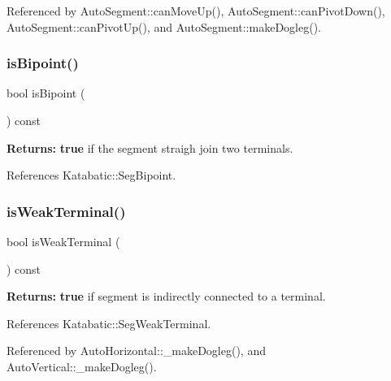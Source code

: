 Referenced by Auto\+Segment\+::can\+Move\+Up(), Auto\+Segment\+::can\+Pivot\+Down(), Auto\+Segment\+::can\+Pivot\+Up(), and Auto\+Segment\+::make\+Dogleg().

\mbox{\label{classKatabatic_1_1AutoSegment_a72741158d19af38e84c5e9c08f91270f}} 
\subsubsection{\texorpdfstring{is\+Bipoint()}{isBipoint()}}
{\footnotesize\ttfamily bool is\+Bipoint (\begin{DoxyParamCaption}{ }\end{DoxyParamCaption}) const\hspace{0.3cm}{\ttfamily [inline]}}

{\bfseries Returns\+:} {\bfseries true} if the segment straigh join two terminals. 

References Katabatic\+::\+Seg\+Bipoint.

\mbox{\label{classKatabatic_1_1AutoSegment_aef3a61d223be84ac336c4f7bc64884ba}} 
\subsubsection{\texorpdfstring{is\+Weak\+Terminal()}{isWeakTerminal()}}
{\footnotesize\ttfamily bool is\+Weak\+Terminal (\begin{DoxyParamCaption}{ }\end{DoxyParamCaption}) const\hspace{0.3cm}{\ttfamily [inline]}}

{\bfseries Returns\+:} {\bfseries true} if segment is indirectly connected to a terminal. 

References Katabatic\+::\+Seg\+Weak\+Terminal.



Referenced by Auto\+Horizontal\+::\+\_\+make\+Dogleg(), and Auto\+Vertical\+::\+\_\+make\+Dogleg().

\mbox{\label{classKatabatic_1_1AutoSegment_a4605c9284168f0a62fa48aa2d3ae5ee9}} 
